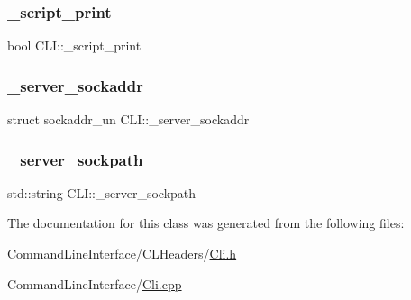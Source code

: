 \mbox{\label{class_c_l_i_a294b192f7400c451c7d4ee983ca11d21}} 
\subsubsection{\texorpdfstring{\+\_\+script\+\_\+print}{\_script\_print}}
{\footnotesize\ttfamily bool C\+L\+I\+::\+\_\+script\+\_\+print\hspace{0.3cm}{\ttfamily [private]}}

\mbox{\label{class_c_l_i_a8100e64420f5528d1a09a18433ae24f9}} 
\subsubsection{\texorpdfstring{\+\_\+server\+\_\+sockaddr}{\_server\_sockaddr}}
{\footnotesize\ttfamily struct sockaddr\+\_\+un C\+L\+I\+::\+\_\+server\+\_\+sockaddr\hspace{0.3cm}{\ttfamily [private]}}

\mbox{\label{class_c_l_i_a582f907a9e5dc5c0dcd264e2f1b14f76}} 
\subsubsection{\texorpdfstring{\+\_\+server\+\_\+sockpath}{\_server\_sockpath}}
{\footnotesize\ttfamily std\+::string C\+L\+I\+::\+\_\+server\+\_\+sockpath\hspace{0.3cm}{\ttfamily [private]}}



The documentation for this class was generated from the following files\+:\begin{DoxyCompactItemize}
\item 
Command\+Line\+Interface/\+C\+L\+Headers/\mbox{\hyperlink{_cli_8h}{Cli.\+h}}\item 
Command\+Line\+Interface/\mbox{\hyperlink{_cli_8cpp}{Cli.\+cpp}}\end{DoxyCompactItemize}
